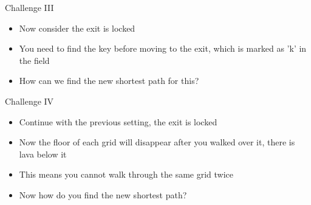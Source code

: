 \documentclass[10pt,xcolor={table,dvipsnames},t]{beamer}
\begin{document}
\begin{frame}[fragile]{Challenge III}
  \begin{itemize}
    \item Now consider the exit is locked
    \item You need to find the key before moving to the exit, which is marked as 'k' in the field
    \item How can we find the new shortest path for this?
  \end{itemize}
\end{frame}

\begin{frame}[fragile]{Challenge IV}
  \begin{itemize}
    \item Continue with the previous setting, the exit is locked
    \item Now the floor of each grid will disappear after you walked over it, there is lava below it
    \item This means you cannot walk through the same grid twice
    \item Now how do you find the new shortest path?
  \end{itemize}
\end{frame}
\end{document}
